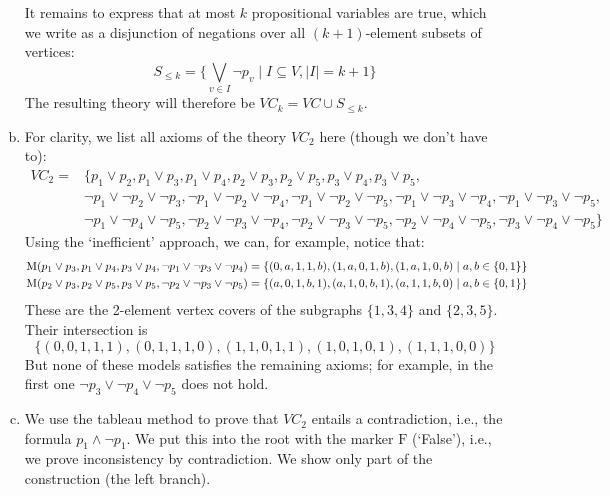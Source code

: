 \begin{problem}
\begin{solution}
\begin{enumerate}[(a)]
            It remains to express that at most $k$ propositional variables are true, which we write as a disjunction of negations over all $(k+1)$-element subsets of vertices:
            $$
            S_{\leq k}=\{\bigvee_{v\in I} \neg p_v\mid I\subseteq V,|I|=k+1\}
            $$
            The resulting theory will therefore be $VC_k=VC\cup S_{\leq k}$.
            \item For clarity, we list all axioms of the theory $VC_2$ here (though we don’t have to):
            \begin{align*}
                VC_2=&\{p_1\lor p_2,p_1\lor p_3,p_1\lor p_4,p_2\lor p_3,p_2\lor p_5,p_3\lor p_4,p_3\lor p_5,\\
                &\neg p_1\lor\neg p_2\lor\neg p_3,\neg p_1\lor\neg p_2\lor\neg p_4,
                \neg p_1\lor\neg p_2\lor\neg p_5,\neg p_1\lor\neg p_3\lor\neg p_4,
                \neg p_1\lor\neg p_3\lor\neg p_5,\\ &\neg p_1\lor\neg p_4\lor\neg p_5,
                \neg p_2\lor\neg p_3\lor\neg p_4,\neg p_2\lor\neg p_3\lor\neg p_5,
                \neg p_2\lor\neg p_4\lor\neg p_5,\neg p_3\lor\neg p_4\lor\neg p_5\}
            \end{align*}
            Using the ‘inefficient’ approach, we can, for example, notice that:
            \begin{align*}
                \operatorname{M}(p_1\lor p_3,p_1\lor p_4,p_3\lor p_4,\neg p_1\lor\neg p_3\lor\neg p_4)&=\{(0,a,1,1,b),(1,a,0,1,b),(1,a,1,0,b)\mid a,b\in\{0,1\}\}\\
                \operatorname{M}(p_2\lor p_3,p_2\lor p_5,p_3\lor p_5,\neg p_2\lor\neg p_3\lor\neg p_5)&=\{(a,0,1,b,1),(a,1,0,b,1),(a,1,1,b,0)\mid a,b\in\{0,1\}\}\\
            \end{align*}
            These are the 2-element vertex covers of the subgraphs $\{1,3,4\}$ and $\{2,3,5\}$. Their intersection is
            $$
                \{(0,0,1,1,1),(0,1,1,1,0),(1,1,0,1,1),(1,0,1,0,1),(1,1,1,0,0)\}
            $$
            But none of these models satisfies the remaining axioms; for example, in the first one $\neg p_3\lor\neg p_4\lor\neg p_5$ does not hold.
            \item We use the tableau method to prove that $VC_2$ entails a contradiction, i.e., the formula $p_1\land \neg p_1$. We put this into the root with the marker $\mathrm{F}$ (`False’), i.e., we prove inconsistency by contradiction. We show only part of the construction (the left branch).
           

\end{enumerate}
\end{solution}
\end{problem}
